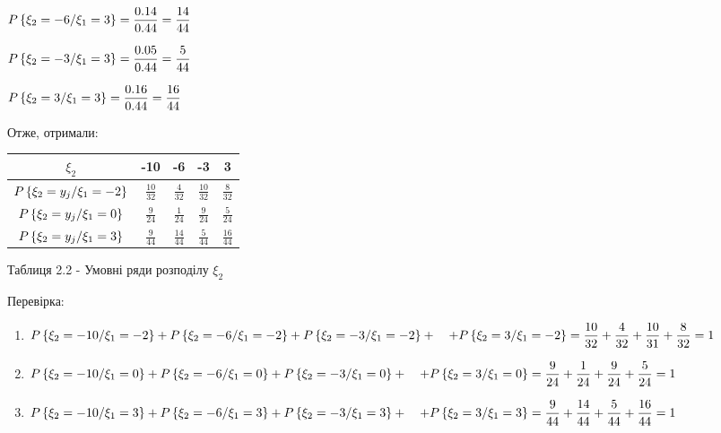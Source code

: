 \documentclass[a4paper, 20pt, titlepage]{article}
\begin{document}
\begin{enumerate}
\begin{spacing}{2.3}
$\displaystyle{P\left\{\xi_2 = -6 / \xi_1 = 3 \right\}  = \frac{0.14}{0.44}} = \frac{14}{44}$

$\displaystyle{P\left\{\xi_2 = -3 / \xi_1 = 3 \right\}  = \frac{0.05}{0.44}} = \frac{5}{44}$

$\displaystyle{P\left\{\xi_2 = 3 / \xi_1 = 3 \right\}  = \frac{0.16}{0.44}} = \frac{16}{44}$


\end{spacing}

Отже, отримали:



\vspace{-2mm}
\begin{spacing}{2}
\begin{center}
\begin{tabular}{|c|c|c|c|c|}
\hline
$\xi_2$ & -10 & -6 & -3 & 3 \\ \hline
$P\left\{\xi_2 = y_j / \xi_1 = -2 \right\}$ & $\frac{10}{32}$ & $\frac{4}{32}$ & $\frac{10}{32}$ & $\frac{8}{32}$ \\ \hline
$P\left\{\xi_2 = y_j / \xi_1 = 0 \right\}$ & $\frac{9}{24}$ & $\frac{1}{24}$ & $\frac{9}{24}$ & $\frac{5}{24}$ \\ \hline
$P\left\{\xi_2 = y_j / \xi_1 = 3 \right\}$ & $\frac{9}{44}$ & $\frac{14}{44}$ & $\frac{5}{44}$ & $\frac{16}{44}$ \\ \hline

\end{tabular}

\vspace{3mm}
Таблиця 2.2 - Умовні ряди розподілу $\xi_2$
\end{center}
\end{spacing}

Перевірка:

\begin{spacing}{2}
\begin{enumerate}
\item $P\left\{\xi_2 = -10 / \xi_1 = -2 \right\} + P\left\{\xi_2 = -6 / \xi_1 = -2 \right\} + P\left\{\xi_2 = -3 / \xi_1 = -2 \right\} + \quad + P\left\{\xi_2 = 3 / \xi_1 = -2 \right\} = \displaystyle{\frac{10}{32} + \frac{4}{32} + \frac{10}{31} + \frac{8}{32} = 1}$
\vspace{2mm}

\item $P\left\{\xi_2 = -10 / \xi_1 = 0 \right\} + P\left\{\xi_2 = -6 / \xi_1 = 0 \right\} + P\left\{\xi_2 = -3 / \xi_1 = 0 \right\} + \quad + P\left\{\xi_2 = 3 / \xi_1 = 0 \right\} = \displaystyle{\frac{9}{24} + \frac{1}{24} + \frac{9}{24} + \frac{5}{24} = 1}$
\vspace{2mm}

\item $P\left\{\xi_2 = -10 / \xi_1 = 3 \right\} + P\left\{\xi_2 = -6 / \xi_1 = 3 \right\} + P\left\{\xi_2 = -3 / \xi_1 = 3 \right\} + \quad + P\left\{\xi_2 = 3 / \xi_1 = 3 \right\} = \displaystyle{\frac{9}{44} + \frac{14}{44} + \frac{5}{44} + \frac{16}{44} = 1}$

\end{enumerate}
\end{spacing}
\end{enumerate}
\end{document}
